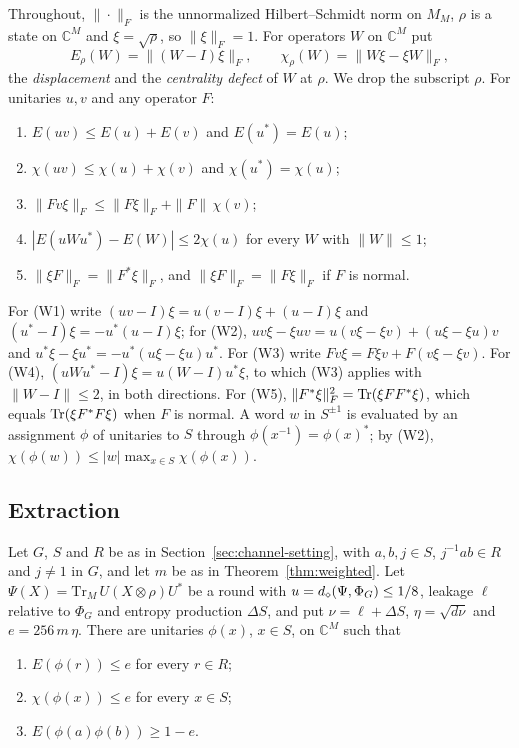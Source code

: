 Throughout, $\|\cdot\|_F$ is the unnormalized Hilbert--Schmidt norm on $M_M$, $\rho$ is a state on $\mathbb C^M$ and $\xi=\sqrt\rho$, so
$\|\xi\|_F=1$. For operators $W$ on $\mathbb C^M$ put
\[
E_\rho(W)=\|(W-I)\xi\|_F,\qquad\chi_\rho(W)=\|W\xi-\xi W\|_F,
\]
the \emph{displacement} and the \emph{centrality defect} of $W$ at $\rho$. We drop the subscript $\rho$. For unitaries $u,v$ and any operator $F$:
\begin{enumerate}[label=(W\arabic*),itemsep=1pt]
\item $E(uv)\le E(u)+E(v)$ and $E(u^*)=E(u)$;
\item $\chi(uv)\le\chi(u)+\chi(v)$ and $\chi(u^*)=\chi(u)$;
\item $\|Fv\xi\|_F\le\|F\xi\|_F+\|F\|\,\chi(v)$;
\item $|E(uWu^*)-E(W)|\le2\chi(u)$ for every $W$ with $\|W\|\le1$;
\item $\|\xi F\|_F=\|F^*\xi\|_F$, and $\|\xi F\|_F=\|F\xi\|_F$ if $F$ is normal.
\end{enumerate}
For (W1) write $(uv-I)\xi=u(v-I)\xi+(u-I)\xi$ and $(u^*-I)\xi=-u^*(u-I)\xi$; for (W2), $uv\xi-\xi uv=u(v\xi-\xi v)+(u\xi-\xi u)v$ and
$u^*\xi-\xi u^*=-u^*(u\xi-\xi u)u^*$. For (W3) write $Fv\xi=F\xi v+F(v\xi-\xi v)$. For (W4), $(uWu^*-I)\xi=u(W-I)u^*\xi$, to which (W3) applies
with $\|W-I\|\le2$, in both directions. For (W5), $\|F^*\xi\|_F^2=\operatorname{Tr}(\xi FF^*\xi)$, which equals $\operatorname{Tr}(\xi F^*F\xi)$ when $F$ is normal. A word
$w$ in $S^{\pm1}$ is evaluated by an assignment $\phi$ of unitaries to $S$ through $\phi(x^{-1})=\phi(x)^*$; by (W2),
$\chi(\phi(w))\le|w|\max_{x\in S}\chi(\phi(x))$.

\subsection{Extraction}

\begin{lemma}\label{lem:weighted-extraction}
Let $G$, $S$ and $R$ be as in Section~\ref{sec:channel-setting}, with $a,b,j\in S$, $j^{-1}ab\in R$ and $j\ne1$ in $G$, and let $m$ be as in
Theorem~\ref{thm:weighted}. Let $\Psi(X)=\mathrm{Tr}_M\,U(X\otimes\rho)U^*$
be a round with $u=d_\diamond(\Psi,\Phi_G)\le1/8$, leakage $\ell$ relative to $\Phi_G$ and entropy production $\Delta S$, and put $\nu=\ell+\Delta S$,
$\eta=\sqrt{d\nu}$ and $e=256\,m\,\eta$. There are unitaries $\phi(x)$, $x\in S$, on $\mathbb C^M$ such that
\begin{enumerate}[label=(\roman*),itemsep=1pt]
\item $E(\phi(r))\le e$ for every $r\in R$;
\item $\chi(\phi(x))\le e$ for every $x\in S$;
\item $E(\phi(a)\phi(b))\ge1-e$.
\end{enumerate}
\end{lemma}

